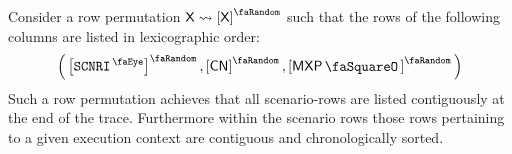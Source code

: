 Consider a row permutation $\col{X}\rightsquigarrow\order{\col{X}}$ such that the rows of the following columns are listed in lexicographic order:
\[
	\Big(
	\order{\isMxpScenario},
	\order{\cn},
	\order{\mxpStamp}
	\Big)
\]
Such a row permutation achieves that all scenario-rows are listed contiguously at the end of the trace.
Furthermore within the scenario rows those rows pertaining to a given execution context are contiguous and chronologically sorted.

